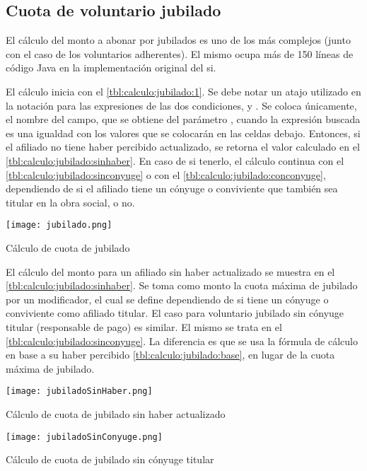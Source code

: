 \subsection{Cuota de voluntario jubilado}

El cálculo del monto a abonar por jubilados es uno de los más complejos (junto con el caso de los voluntarios adherentes).
El mismo ocupa más de 150 líneas de código Java en la implementación original del \acrshort{si}.

El cálculo inicia con el \cref{tbl:calculo:jubilado:1}.
Se debe notar un atajo utilizado en la notación para las expresiones de las dos condiciones,  y .
Se coloca únicamente, el nombre del campo, que se obtiene del parámetro , cuando la expresión buscada es una igualdad con los valores que se colocarán en las celdas debajo.
Entonces, si el afiliado no tiene haber percibido actualizado, se retorna el valor calculado en el \cref{tbl:calculo:jubilado:sinhaber}. 
En caso de si tenerlo, 
el cálculo continua con el \cref{tbl:calculo:jubilado:sinconyuge} o con el \cref{tbl:calculo:jubilado:conconyuge}, dependiendo de si el afiliado tiene un cónyuge o conviviente que también sea titular en la obra social, o no.

\begin{table*}
    \centering
    \texttt{[image: jubilado.png]}
    \caption{Cálculo de cuota de jubilado}
    \label{tbl:calculo:jubilado:1}
\end{table*}

El cálculo del monto para un afiliado sin haber actualizado se muestra en el \cref{tbl:calculo:jubilado:sinhaber}.
Se toma como monto la cuota máxima de jubilado por un modificador, el cual se define dependiendo de si tiene un cónyuge o conviviente como afiliado titular.
El caso para voluntario jubilado sin cónyuge titular (responsable de pago) es similar.
El mismo se trata en el \cref{tbl:calculo:jubilado:sinconyuge}.
La diferencia es que se usa la fórmula de cálculo en base a su haber percibido \cref{tbl:calculo:jubilado:base}, en lugar de la cuota máxima de jubilado.

\begin{table*}
    \centering
    \texttt{[image: jubiladoSinHaber.png]}
    \caption{Cálculo de cuota de jubilado sin haber actualizado}
    \label{tbl:calculo:jubilado:sinhaber}
\end{table*}


\begin{table*}
    \centering
    \texttt{[image: jubiladoSinConyuge.png]}
    \caption{Cálculo de cuota de jubilado sin cónyuge titular}
    \label{tbl:calculo:jubilado:sinconyuge}
\end{table*}

